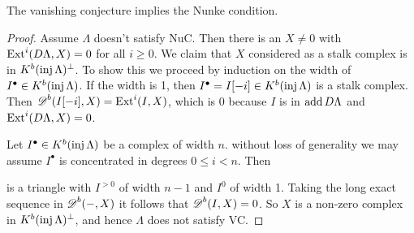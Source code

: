 \begin{theorem} \cite[1.2]{Hap93} \label{thm:VC_implies_Nuc}
	The vanishing conjecture implies the Nunke condition.
	\begin{proof}
		Assume $\Lambda$ doesn't satisfy NuC. Then there is an $X \neq 0$ with $\operatorname{Ext}^i(D\Lambda, X) = 0$ for all $i \geq 0$. We claim that $X$ considered as a stalk complex is in $K^b(\operatorname{inj}\Lambda)^\perp$. To show this we proceed by induction on the width of $I^\bullet \in K^b(\operatorname{inj}\Lambda)$. If the width is 1, then $I^\bullet = I[-i] \in K^b(\operatorname{inj}\Lambda)$ is a stalk complex. Then $\operatorname{\mathscr{D}}^b(I[-i], X) = \operatorname{Ext}^i(I, X)$, which is 0 because $I$ is in $\operatorname{add} D\Lambda$ and $\operatorname{Ext}^i(D\Lambda, X)=0$.
		
		Let $I^\bullet \in K^b(\operatorname{inj}\Lambda)$ be a complex of width $n$. without loss of generality we may assume $I^\bullet$ is concentrated in degrees $0 \leq i < n$. Then 
		\begin{center}
		\end{center}
		is a triangle with $I^{>0}$ of width $n-1$ and $I^0$ of width 1. Taking the long exact sequence in $\operatorname{\mathscr{D}}^b(-,X)$ it follows that $\operatorname{\mathscr{D}}^b(I, X)=0$. So $X$ is a non-zero complex in $K^b(\operatorname{inj}\Lambda)^\perp$, and hence $\Lambda$ does not satisfy VC.
	\end{proof}
\end{theorem}

%
%		

